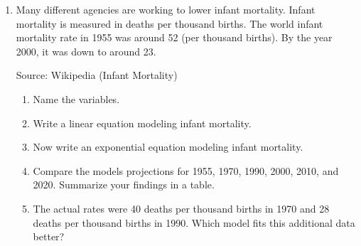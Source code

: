 \begin{enumerate}
\begin{enumerate}
\end{enumerate} 

\newpage

\item Many different agencies are working to lower infant mortality.  Infant mortality is measured in deaths per thousand births.  The world infant mortality rate in 1955 was around 52 (per thousand births).  By the year 2000, it was down to around 23.

\hfill \begin{footnotesize}  Source: Wikipedia (Infant Mortality) \end{footnotesize}
\begin{enumerate}
\item Name the variables. 
\vfill
\item Write a linear equation modeling infant mortality. 
\vfill
\vfill
\item Now write an exponential equation modeling infant mortality. 
\vfill
\vfill

\item Compare the models projections for 1955, 1970, 1990, 2000, 2010, and 2020.  Summarize your findings in a table. 
\vfill
\vfill
\item The actual rates were 40 deaths per thousand births in 1970 and 28 deaths per thousand births in 1990.  Which model fits this additional data better? 
\vfill
\end{enumerate}  

\end{enumerate}